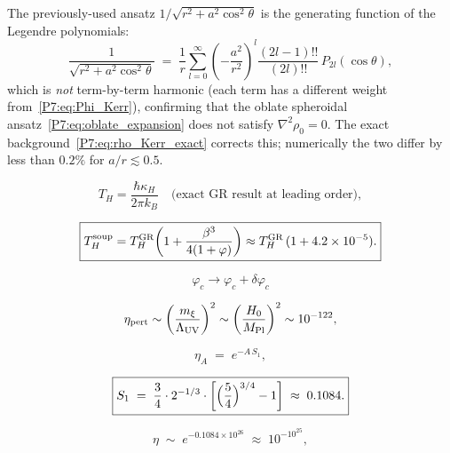 \begin{remark}
\label{P7:rem:oblate}
The previously-used ansatz $1/\sqrt{r^2+a^2\cos^2\!\theta}$ is the generating
function of the Legendre polynomials:
\begin{equation}
  \frac{1}{\sqrt{r^2+a^2\cos^2\!\theta}}
  \;=\; \frac{1}{r}\sum_{l=0}^\infty
        \left(-\frac{a^2}{r^2}\right)^{\!l}
        \frac{(2l-1)!!}{(2l)!!}\,P_{2l}(\cos\theta),
  \label{P7:eq:oblate_expansion}
\end{equation}
which is \emph{not} term-by-term harmonic (each term has a different weight
from~\eqref{P7:eq:Phi_Kerr}), confirming that the oblate spheroidal
ansatz~\eqref{P7:eq:oblate_expansion} does not
satisfy $\nabla^2\rho_0=0$.  The exact background~\eqref{P7:eq:rho_Kerr_exact}
corrects this; numerically the two differ by less than $0.2\%$ for $a/r\lesssim0.5$.
\end{remark}

\begin{equation}
  T_H = \frac{\hbar\kappa_H}{2\pi k_B}
  \quad\text{(exact GR result at leading order)},
  \label{P7:eq:TH}
\end{equation}

\begin{equation}
  \boxed{T_H^{\mathrm{soup}} = T_H^{\mathrm{GR}}\!\left(1 + \frac{\beta^3}{4(1+\varphi)}\right)
  \approx T_H^{\mathrm{GR}}\,(1+4.2\times10^{-5}).}
  \label{P7:eq:TH_correction}
\end{equation}

\begin{equation}
  \varphi_c \to \varphi_c + \delta\varphi_c
  \label{P7:eq:shift}
\end{equation}

\begin{equation}
  \eta_{\mathrm{pert}} \sim
  \left(\frac{m_\xi}{\Lambda_{\mathrm{UV}}}\right)^2
  \sim \left(\frac{H_0}{M_{\mathrm{Pl}}}\right)^2
  \sim 10^{-122},
  \label{P7:eq:eta_pert}
\end{equation}

\begin{equation}
  \eta_A \;=\; e^{-A\,S_1},
  \label{P7:eq:eta_A}
\end{equation}

\begin{equation}
  \boxed{S_1
  \;=\; \frac{3}{4}\cdot 2^{-1/3}
        \cdot\left[\Bigl(\frac{5}{4}\Bigr)^{3/4}-1\right]
  \;\approx\; 0.1084.}
  \label{P7:eq:S1_FP}
\end{equation}

\begin{equation}
  \eta \;\sim\; e^{-0.1084\times10^{26}} \;\approx\; 10^{-10^{25}},
  \label{P7:eq:eta_macro}
\end{equation}

